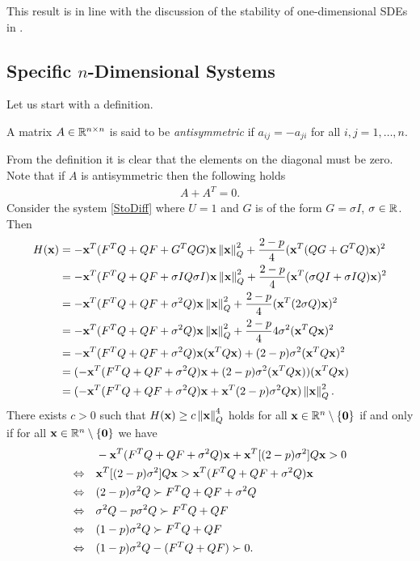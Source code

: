 \documentclass[a4paper,12pt,twoside,BCOR=10mm]{scrbook}
\begin{document}
This result is in line with the discussion of the stability of one-dimensional SDEs in \citep[p.~154]{sdestab2012khaminskii}.

\subsection{Specific $n$-Dimensional Systems}
Let us start with a definition.
\begin{definition}
A matrix $A\in \mathbb{R}^{n\times n}$ is said to be \textit{antisymmetric} if $a_{ij} = -a_{ji}$ for all $i,j = 1, \ldots, n$.
\end{definition}
From the definition it is clear that the elements on the diagonal must be zero. Note that if $A$ is antisymmetric then the following holds
\begin{align*}
    A + A^T = 0.
\end{align*}
Consider the system \eqref{StoDiff} where $U = 1$ and $G$ is of the form $G = \sigma I$, $\sigma \in \mathbb{R}^{}$. Then
\begin{align*}
    H(\mathbf{x}) &= -\mathbf{x}^T(F^TQ + QF + G^TQG)\mathbf{x}\left\lVert\mathbf{x} \right\rVert_{Q}^{2} + \frac{2 - p}{4}(\mathbf{x}^T(QG + G^TQ)\mathbf{x})^2\\
    &= -\mathbf{x}^T(F^TQ + QF + \sigma I Q \sigma I)\mathbf{x}\left\lVert\mathbf{x} \right\rVert_{Q}^{2} + \frac{2 - p}{4}(\mathbf{x}^T(\sigma QI + \sigma IQ)\mathbf{x})^2\\
    &= -\mathbf{x}^T(F^TQ + QF + \sigma^2 Q)\mathbf{x}\left\lVert\mathbf{x} \right\rVert_{Q}^{2} + \frac{2-p}{4}(\mathbf{x}^T(2\sigma Q)\mathbf{x})^2\\
    &= -\mathbf{x}^T(F^TQ + QF + \sigma^2 Q)\mathbf{x}\left\lVert\mathbf{x} \right\rVert_{Q}^{2} + \frac{2 - p}{4}4\sigma^2(\mathbf{x}^TQ\mathbf{x})^2\\
    &= -\mathbf{x}^T(F^TQ + QF + \sigma^2 Q)\mathbf{x}(\mathbf{x}^TQ\mathbf{x}) + (2-p)\sigma^2(\mathbf{x}^TQ\mathbf{x})^2\\
    &= (-\mathbf{x}^T(F^TQ + QF + \sigma^2 Q)\mathbf{x} + (2-p)\sigma^2(\mathbf{x}^T Q\mathbf{x}))(\mathbf{x}^T Q\mathbf{x})\\
    &= (-\mathbf{x}^T(F^TQ + QF + \sigma^2 Q)\mathbf{x} + \mathbf{x}^T (2-p)\sigma^2Q\mathbf{x})\left\lVert\mathbf{x}\right\rVert_{Q}^{2}.
\end{align*}
There exists $c > 0$ such that $H(\mathbf{x}) \geq c\left\lVert\mathbf{x}\right\rVert_{Q}^{4}$ holds for all $\mathbf{x} \in \mathbb{R}^{n}\setminus \{\mathbf{0}\}$ if and only if for all $\mathbf{x} \in \mathbb{R}^{n}\setminus \{\mathbf{0}\}$ we have
\begin{align*}
    &-\mathbf{x}^T(F^TQ + QF + \sigma^2 Q)\mathbf{x} + \mathbf{x}^T [(2-p)\sigma^2]Q\mathbf{x} > 0 \\
    \Leftrightarrow \quad&\mathbf{x}^T [(2-p)\sigma^2]Q\mathbf{x} > \mathbf{x}^T(F^TQ + QF + \sigma^2 Q)\mathbf{x}\\
    \Leftrightarrow \quad& (2-p)\sigma^2Q \succ F^TQ + QF + \sigma^2 Q\\
    \Leftrightarrow \quad& \sigma^2 Q - p\sigma^2 Q \succ F^TQ + QF\\
    \Leftrightarrow \quad& (1 - p)\sigma^2 Q \succ  F^TQ + QF\\
    \Leftrightarrow \quad& (1 - p)\sigma^2Q - (F^TQ + QF) \succ 0.
\end{align*}
\end{document}
